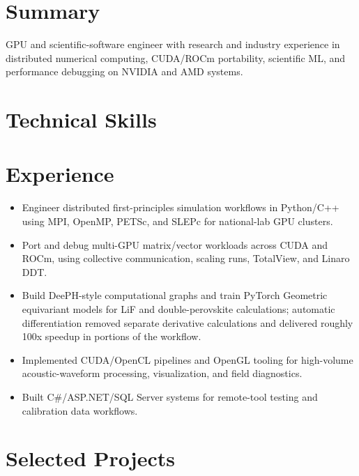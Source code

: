 \section{Summary}
GPU and scientific-software engineer with research and industry experience in distributed numerical computing, CUDA/ROCm portability, scientific ML, and performance debugging on NVIDIA and AMD systems.
\section{Technical Skills}
\section{Experience}
\begin{itemize}
\item Engineer distributed first-principles simulation workflows in Python/C++ using MPI, OpenMP, PETSc, and SLEPc for national-lab GPU clusters.
\item Port and debug multi-GPU matrix/vector workloads across CUDA and ROCm, using collective communication, scaling runs, TotalView, and Linaro DDT.
\item Build DeePH-style computational graphs and train PyTorch Geometric equivariant models for LiF and double-perovskite calculations; automatic differentiation removed separate derivative calculations and delivered roughly 100x speedup in portions of the workflow.
\end{itemize}
\begin{itemize}
\item Implemented CUDA/OpenCL pipelines and OpenGL tooling for high-volume acoustic-waveform processing, visualization, and field diagnostics.
\item Built C\#/ASP.NET/SQL Server systems for remote-tool testing and calibration data workflows.
\end{itemize}
\section{Selected Projects}
